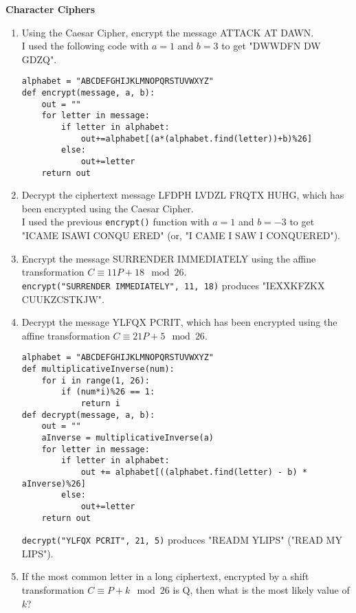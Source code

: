\documentclass{article}
\begin{document}
\begin{flushleft}
    \LARGE\textbf{Character Ciphers}\normalsize\\ \vspace{11pt}
\end{flushleft}
\begin{enumerate}
    \item Using the Caesar Cipher, encrypt the message ATTACK AT DAWN.\\
          I used the following code with $a = 1$ and $b = 3$ to get "DWWDFN DW GDZQ".
          \begin{verbatim}
alphabet = "ABCDEFGHIJKLMNOPQRSTUVWXYZ"
def encrypt(message, a, b):
    out = ""
    for letter in message:
        if letter in alphabet:
            out+=alphabet[(a*(alphabet.find(letter))+b)%26]
        else:
            out+=letter
    return out
          \end{verbatim}
    \item Decrypt the ciphertext message LFDPH LVDZL FRQTX HUHG, which has been encrypted using the Caesar Cipher.\\
          I used the previous \texttt{encrypt()} function with $a = 1$ and $b = -3$ to get "ICAME ISAWI CONQU ERED" (or, "I CAME I SAW I CONQUERED").
    \item Encrypt the message SURRENDER IMMEDIATELY using the affine transformation $C \equiv 11P + 18 \mod{26}$.\\
          \texttt{encrypt("SURRENDER IMMEDIATELY", 11, 18)} produces "IEXXKFZKX CUUKZCSTKJW".
    \item Decrypt the message YLFQX PCRIT, which has been encrypted using the affine transformation $C \equiv 21P + 5 \mod{26}$.
          \begin{verbatim}
alphabet = "ABCDEFGHIJKLMNOPQRSTUVWXYZ"
def multiplicativeInverse(num):
    for i in range(1, 26):
        if (num*i)%26 == 1:
            return i
def decrypt(message, a, b):
    out = ""
    aInverse = multiplicativeInverse(a)
    for letter in message:
        if letter in alphabet:
            out += alphabet[((alphabet.find(letter) - b) * aInverse)%26]
        else:
            out+=letter
    return out
          \end{verbatim}
          \texttt{decrypt("YLFQX PCRIT", 21, 5)} produces "READM YLIPS" ("READ MY LIPS").
    \item If the most common letter in a long ciphertext, encrypted by a shift transformation $C \equiv P + k \mod{26}$ is Q, then what is the most likely value of $k$?\\

\end{enumerate}
\end{document}
